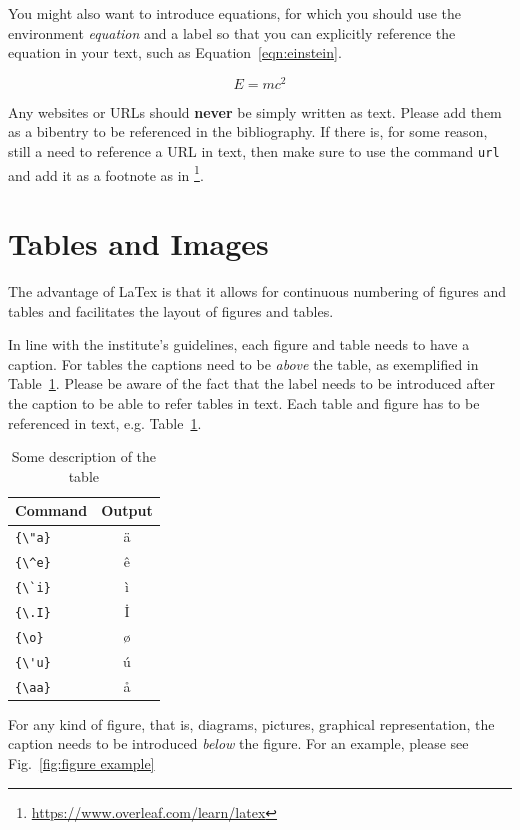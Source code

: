 \documentclass[a4paper,fontsize=12pt,listof=totoc,bibliography=totoc]{scrbook}
\begin{document}
You might also want to introduce equations, for which you should use the environment \textit{equation} and a label so that you can explicitly reference the equation in your text, such as Equation~\ref{eqn:einstein}.

\begin{equation}
    \label{eqn:einstein}
     E=mc^2
\end{equation}

Any websites or URLs should \textbf{never} be simply written as text. Please add them as a bibentry to be referenced in the bibliography. If there is, for some reason, still a need to reference a URL in text, then make sure to use the command \texttt{url} and add it as a footnote as in \footnote{\url{https://www.overleaf.com/learn/latex}}.

\section{Tables and Images}
The advantage of LaTex is that it allows for continuous numbering of figures and tables and facilitates the layout of figures and tables. 

In line with the institute's guidelines, each figure and table needs to have a caption. For tables the captions need to be \textit{above} the table, as exemplified in Table~\ref{tab:table example}. Please be aware of the fact that the label needs to be introduced after the caption to be able to refer tables in text. Each table and figure has to be referenced in text, e.g. Table~\ref{tab:table example}.

\begin{table}[htb]
    \centering
    \caption{Some description of the table}
	\label{tab:table example}
    \begin{tabular}{|l|c|}
    \hline
    \textbf{Command} & \textbf{Output}\\
    \hline
    \verb|{\"a}| & {\"a} \\
    \verb|{\^e}| & {\^e} \\
    \verb|{\`i}| & {\`i} \\ 
    \verb|{\.I}| & {\.I} \\ 
    \verb|{\o}| & {\o} \\
    \verb|{\'u}| & {\'u}  \\ 
    \verb|{\aa}| & {\aa}  \\\hline
    \end{tabular}
\end{table}

For any kind of figure, that is, diagrams, pictures, graphical representation, the caption needs to be introduced \textit{below} the figure. For an example, please see Fig.~\ref{fig:figure example}
\end{document}

